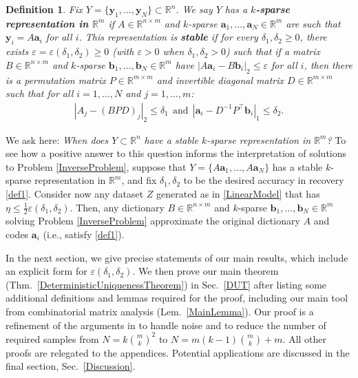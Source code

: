 \documentclass[journal, twocolumn]{IEEEtran}
\newtheorem{definition}{Definition}
\begin{document}
\begin{definition}\label{Uniqueness}
Fix $Y = \{ \mathbf{y}_1, \ldots, \mathbf{y}_N\} \subset \mathbb{R}^n$. We say $Y$ has a \textbf{$k$-sparse representation in $\mathbb{R}^m$} if $A \in \mathbb{R}^{n \times m}$ and $k$-sparse $\mathbf{a}_1, \ldots, \mathbf{a}_N \in \mathbb{R}^m$ are such that $\mathbf{y}_i = A\mathbf{a}_i$ for all $i$. This representation is \textbf{stable} if for every $\delta_1, \delta_2 \geq 0$, there exists $\varepsilon = \varepsilon(\delta_1, \delta_2) \geq 0$ (with $\varepsilon > 0$ when  $\delta_1, \delta_2 > 0$) such that if a matrix $B \in \mathbb{R}^{n \times m}$ and $k$-sparse $\mathbf{b}_1, \ldots, \mathbf{b}_N \in \mathbb{R}^m$ have \mbox{$|A\mathbf{a}_i - B\mathbf{b}_i|_2 \leq \varepsilon$} for all $i$, then there is a permutation matrix $P \in \mathbb{R}^{m \times m}$ and invertible diagonal matrix $D \in \mathbb{R}^{m \times m}$ such that for all $i = 1,\ldots,N$ and $j = 1,\ldots,m$:
\begin{align}\label{def1}
|A_j - (BPD)_j|_2 \leq \delta_1 \ \ \text{and} \ \ |\mathbf{a}_i - D^{-1}P^{\top}\mathbf{b}_i|_1 \leq \delta_2.
\end{align}
\end{definition}

We ask here: \emph{When does $Y \subset \mathbb{R}^n$ have a stable $k$-sparse representation in $\mathbb{R}^m$?} To see how a positive answer to this question informs the interpretation of solutions to Problem \ref{InverseProblem}, suppose that \mbox{$Y = \{A \mathbf{a}_1, \ldots, A\mathbf{a}_N\}$} has a stable $k$-sparse representation in $\mathbb R^m$, and fix $\delta_1, \delta_2$ to be the desired accuracy in recovery \eqref{def1}. Consider now any dataset $Z$ generated as in \eqref{LinearModel} that has $\eta \leq \frac{1}{2} \varepsilon(\delta_1, \delta_2)$. Then, any dictionary $B \in \mathbb{R}^{n \times m}$ and $k$-sparse $\mathbf{b}_1, \ldots, \mathbf{b}_N \in \mathbb{R}^m$ solving Problem \ref{InverseProblem} approximate the original dictionary $A$ and codes $\mathbf{a}_i$ (i.e., satisfy \eqref{def1}).  

In the next section, we give precise statements of our main results, which include an explicit form for $\varepsilon(\delta_1, \delta_2)$. We then prove our main theorem (Thm.~\ref{DeterministicUniquenessTheorem}) in Sec.~\ref{DUT} after listing some additional definitions and lemmas required for the proof, including our main tool from combinatorial matrix analysis (Lem.~\ref{MainLemma}). Our proof is a refinement of the arguments in \cite{Hillar15} to handle noise and to reduce the number of required samples from $N=k{m \choose k}^2$ to $N = m(k-1){m \choose k}+m$. All other proofs are relegated to the appendices. Potential applications are discussed in the final section, Sec.~\ref{Discussion}.
\end{document}
